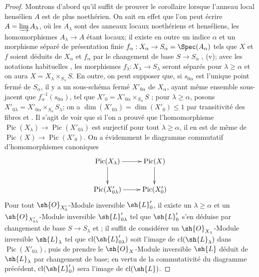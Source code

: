 \begin{proof}
Montrons d'abord qu'il suffit de prouver le corollaire lorsque l'anneau local hensélien $A$ est de plus noethérien.
On sait en effet  que l'on peut écrire $A=\varinjlim A_\lambda$, où les $A_\lambda$ sont des anneaux locaux noethériens et henséliens, les homomorphismes $A_\lambda\to A$ étant locaux;
il existe en outre un indice $\alpha$ et un morphisme séparé de présentation finie $f_\alpha:X_\alpha\to S_\alpha=\Spec(A_\alpha)$ tels que $X$ et $f$ soient déduits de $X_\alpha$ et $f_\alpha$ par le changement de base $S\to S_\alpha$ , (v);
avec les notations habituelles , les morphismes $f_\lambda:X_\lambda\to S_\lambda$ seront séparés pour $\lambda\geq\alpha$ et on aura $X=X_\lambda\times_{S_\lambda}S$.
En outre, on peut supposer que, si $s_{0\alpha}$ est l'unique point fermé de $S_\alpha$, il y a un sous-schéma fermé $X'_{0\alpha}$ de $X_\alpha$, ayant même ensemble sous-jacent que $f_\alpha^{-1}(s_{0\alpha})$, tel que $X'_0=X'_{0\alpha}\times_{S_\alpha}S$ ;
pour $\lambda\geq\alpha$, posons $X'_{0\lambda}=X'_{0\alpha}\times_{S_\alpha}S_\lambda$;
on a $\dim(X'_{0\lambda})=\dim(X'_0)\leq1$ par transitivité des fibres et .
Il s'agit de voir que si l'on a prouvé que l'homomorphisme $\operatorname{Pic}(X_\lambda)\to\operatorname{Pic}(X'_{0\lambda})$ est surjectif pour tout $\lambda\geq\alpha$, il en est de même de $\operatorname{Pic}(X)\to\operatorname{Pic}(X'_0)$.
On a évidemment le diagramme commutatif d'homomorphismes canoniques
\[
  \xymatrix{
    \operatorname{Pic}(X_\lambda) \ar[r] \ar[d] & \operatorname{Pic}(X) \ar[d]\\
    \operatorname{Pic}(X'_{0\lambda}) \ar[r] & \operatorname{Pic}(X'_0)
  }
\]
Pour tout $\sh{O}_{X'_0}$-Module inversible $\sh{L}'_0$, il existe un $\lambda\geq\alpha$ et un $\sh{O}_{X'_{0\lambda}}$-Module inversible $\sh{L}'_{0\lambda}$ tel que $\sh{L}'_0$ s'en déduise par changement de base $S\to S_\lambda$  et ;
il suffit de considérer un $\sh{O}_{X_\lambda}$-Module inversible $\sh{L}_\lambda$ tel que $\operatorname{cl}(\sh{L}'_{0\lambda})$ soit l'image de $\operatorname{cl}(\sh{L}_\lambda)$ dans $\operatorname{Pic}(X'_{0\lambda})$, puis de prendre le $\sh{O}_X$-Module inversible $\sh{L}$ déduit de $\sh{L}_\lambda$ par changement de base;
en vertu de la commutativité du diagramme précédent, $\operatorname{cl}(\sh{L}'_0)$ sera l'image de $\operatorname{cl}(\sh{L})$.


\end{proof}
